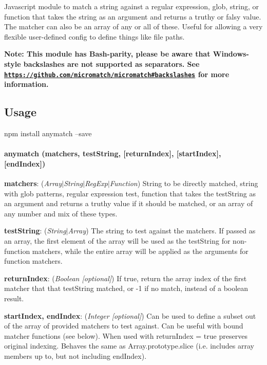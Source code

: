 Javascript module to match a string against a regular expression, glob, string, or function that takes the string as an argument and returns a truthy or falsy value. The matcher can also be an array of any or all of these. Useful for allowing a very flexible user-\/defined config to define things like file paths.

{\bfseries Note\+: This module has Bash-\/parity, please be aware that Windows-\/style backslashes are not supported as separators. See \href{https://github.com/micromatch/micromatch#backslashes}{\tt https\+://github.\+com/micromatch/micromatch\#backslashes} for more information.}

\href{https://nodei.co/npm/anymatch/}{\tt } \href{https://nodei.co/npm-dl/anymatch/}{\tt }

\subsection*{Usage }


\begin{DoxyCode}
npm install anymatch --save
\end{DoxyCode}


\paragraph*{anymatch (matchers, test\+String, \mbox{[}return\+Index\mbox{]}, \mbox{[}start\+Index\mbox{]}, \mbox{[}end\+Index\mbox{]})}


\begin{DoxyItemize}
\item {\bfseries matchers}\+: ({\itshape Array$\vert$\+String$\vert$\+Reg\+Exp$\vert$\+Function}) String to be directly matched, string with glob patterns, regular expression test, function that takes the test\+String as an argument and returns a truthy value if it should be matched, or an array of any number and mix of these types.
\item {\bfseries test\+String}\+: ({\itshape String$\vert$\+Array}) The string to test against the matchers. If passed as an array, the first element of the array will be used as the {\ttfamily test\+String} for non-\/function matchers, while the entire array will be applied as the arguments for function matchers.
\item {\bfseries return\+Index}\+: ({\itshape Boolean \mbox{[}optional\mbox{]}}) If true, return the array index of the first matcher that that test\+String matched, or -\/1 if no match, instead of a boolean result.
\item {\bfseries start\+Index, end\+Index}\+: ({\itshape Integer \mbox{[}optional\mbox{]}}) Can be used to define a subset out of the array of provided matchers to test against. Can be useful with bound matcher functions (see below). When used with {\ttfamily return\+Index = true} preserves original indexing. Behaves the same as {\ttfamily Array.\+prototype.\+slice} (i.\+e. includes array members up to, but not including end\+Index).
\end{DoxyItemize}


